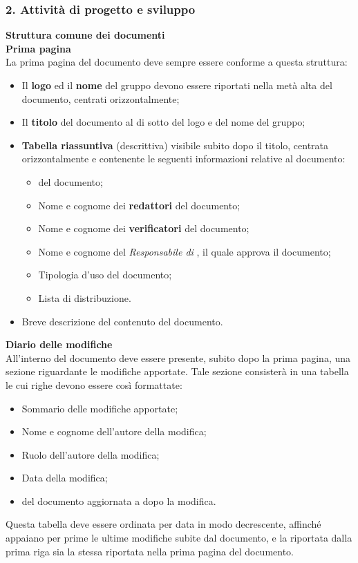 \subsubsection{2. Attivit\`a di progetto e sviluppo}   %
  \textbf{Struttura comune dei documenti} \\
      \textbf{Prima pagina} \\   
      La prima pagina del documento deve sempre essere conforme a questa struttura:
      \begin{itemize}
      \item Il \textbf{logo} ed il \textbf{nome} del gruppo devono essere riportati nella metà alta del documento, centrati orizzontalmente;
      \item Il \textbf{titolo} del documento al di sotto del logo e del nome del gruppo;
      \item \textbf{Tabella riassuntiva} (descrittiva) visibile subito dopo il titolo, centrata orizzontalmente e contenente
		le seguenti informazioni relative al documento:
        \begin{itemize}
        \item {} del documento;
        \item Nome e cognome dei \textbf{redattori} del documento;
        \item Nome e cognome dei \textbf{verificatori} del documento;
        \item Nome e cognome del \textit{Responsabile di }, il quale approva il documento;
        \item Tipologia d'uso del documento;
        \item Lista di distribuzione.
        \end{itemize}
    \item Breve descrizione del contenuto del documento.
      \end{itemize}

  \textbf{Diario delle modifiche} \\
  All'interno del documento deve essere presente, subito dopo la prima pagina, una sezione riguardante le modifiche apportate. Tale sezione consisterà in una tabella le cui righe devono essere cos\`i formattate:
  \begin{itemize}
  \item Sommario delle modifiche apportate;
  \item Nome e cognome dell'autore della modifica;
  \item Ruolo dell'autore della modifica;
  \item Data della modifica;
  \item {} del documento aggiornata a dopo la modifica.
  \end{itemize}
  Questa tabella deve essere ordinata per data in modo decrescente, affinché appaiano per prime le ultime modifiche subite dal documento, e la  riportata dalla prima riga sia la stessa riportata nella prima pagina del documento. \\

